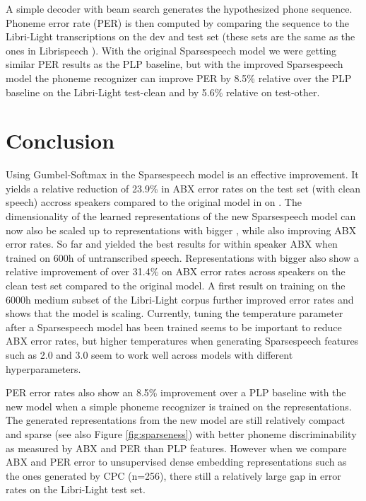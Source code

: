 \documentclass[a4paper]{article}
\begin{document}
A simple decoder with beam search generates the hypothesized phone sequence. Phoneme error rate (PER) is then computed by comparing the sequence to the Libri-Light transcriptions on the dev and test set (these sets are the same as the ones in Librispeech \cite{panayotovlibrispeech}). With the original Sparsespeech model we were getting similar PER results as the PLP baseline, but with the improved Sparsespeech model the phoneme recognizer can improve PER by 8.5\% relative over the PLP baseline on the Libri-Light test-clean and by 5.6\% relative on test-other.




















\section{Conclusion}



Using Gumbel-Softmax in the Sparsespeech model is an effective improvement. It yields a relative reduction of 23.9\% in ABX error rates on the test set (with clean speech) accross speakers compared to the original model in \cite{milde2019sparsespeech} on . The dimensionality of the learned representations of the new Sparsespeech model can now also be scaled up to representations with bigger , while also improving ABX error rates. So far  and  yielded the best results for within speaker ABX when trained on 600h of untranscribed speech. Representations with bigger  also show a relative improvement of over 31.4\% on ABX error rates across speakers on the clean test set compared to the original model. A first result on training on the 6000h medium subset of the Libri-Light corpus further improved error rates and shows that the model is scaling. Currently, tuning the temperature parameter after a Sparsespeech model has been trained seems to be important to reduce ABX error rates, but higher temperatures when generating Sparsespeech features such as 2.0 and 3.0 seem to work well across models with different hyperparameters.

PER error rates also show an 8.5\% improvement over a PLP baseline with the new model when a simple phoneme recognizer is trained on the representations. The generated representations from the new model are still relatively compact and sparse (see also Figure \ref{fig:sparseness}) with better phoneme discriminability as measured by ABX and PER than PLP features. However when we compare ABX and PER error to unsupervised dense embedding representations such as the ones generated by CPC (n=256), there still a relatively large gap in error rates on the Libri-Light test set.
\end{document}
